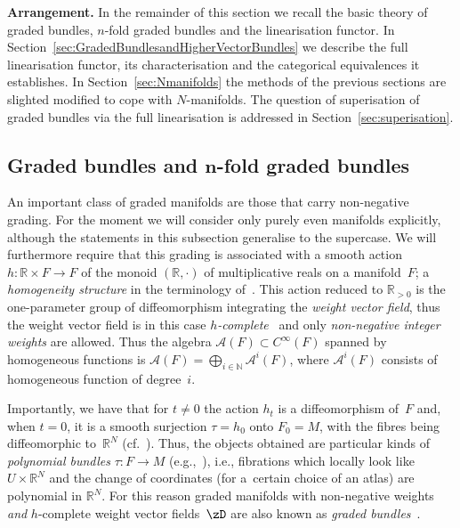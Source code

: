 \documentclass[pdftex]{sigma}
\newcommand{\R}{{\mathbb R}}
\newcommand{\ti}{\times}
\numberwithin{equation}{section}
\begin{document}
\textbf{Arrangement.} In the remainder of this section we recall the basic theory of graded bundles, $n$-fold graded bundles and the linearisation functor. In Section~\ref{sec:GradedBundlesandHigherVectorBundles} we describe the full linearisation functor, its characterisation and the categorical equivalences it establishes. In Section~\ref{sec:Nmanifolds} the methods of the previous sections are slighted modif\/ied to cope with $N$-manifolds. The question of superisation of graded bundles via the full linearisation is addressed in Section~\ref{sec:superisation}.

\subsection[Graded bundles and $n$-fold graded bundles]{Graded bundles and $\boldsymbol{n}$-fold graded bundles}

An important class of graded manifolds are those that carry non-negative grading. For the moment we will consider only purely even manifolds explicitly, although the statements in this subsection generalise to the supercase. We will furthermore require that this grading is associated with a smooth action $h\colon \R\ti F\to F$ of the monoid $(\R,\cdot)$ of multiplicative reals on a mani\-fold~$F$; a \emph{homogeneity structure} in the terminology of~\cite{JG_MR_higher_vb}. This action reduced to $\R_{>0}$ is the one-parameter group of dif\/feomorphism integrating the \emph{weight vector field}, thus the weight vector f\/ield is in this case \emph{$h$-complete}~\cite{Grabowski2013} and only \emph{non-negative integer weights} are allowed. Thus the algebra $\mathcal{A}(F)\subset C^\infty(F)$ spanned by homogeneous functions is $\mathcal{A}(F) = \bigoplus_{i \in \mathbb{N}}\mathcal{A}^{i}(F)$, where $\mathcal{A}^{i}(F)$ consists of homogeneous function of degree~$i$.

Importantly, we have that for $t \neq 0$ the action $h_{t}$ is a dif\/feomorphism of~$F$ and, when $t=0$, it is a smooth surjection $\tau=h_0$ onto $F_{0}=M$, with the f\/ibres being dif\/feomorphic to~$\mathbb{R}^{N}$ (cf.~\cite{JG_MR_higher_vb}). Thus, the objects obtained are particular kinds of \emph{polynomial bundles} $\tau\colon F\to M$ (e.g.,~\cite{Bertram:2014, Voronov:2010_highr_alg}), i.e., f\/ibrations which locally look like $U\times\R^N$ and the change of coordinates (for a~certain choice of an atlas) are polynomial in $\R^N$. For this reason graded manifolds with non-negative weights \emph{and} $h$-complete weight vector f\/ields~$\zD$ are also known as \emph{graded bundles}~\cite{JG_MR_higher_vb}.
\end{document}
